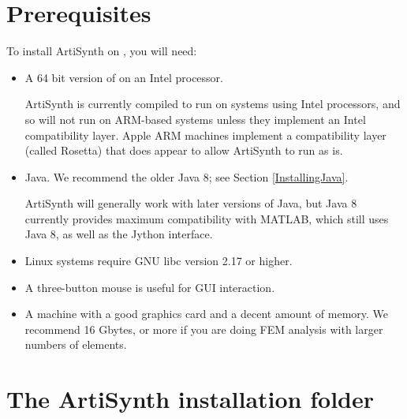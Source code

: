 \section{Prerequisites}
\label{Prerequisites}

To install ArtiSynth on \SYSTEM{}, you will need:

\begin{itemize}

\item A 64 bit version of \SYSTEM{} on an Intel processor.

\begin{sideblock}
ArtiSynth is currently compiled to run on systems using Intel
processors, and so will not run on ARM-based systems unless they
implement an Intel compatibility layer. Apple ARM machines implement a
compatibility layer (called Rosetta) that does appear to allow
ArtiSynth to run as is.
\end{sideblock}

\item Java. We recommend the older Java 8; see Section \ref{InstallingJava}.

\begin{sideblock}
ArtiSynth will generally work with later versions of Java, but Java 8
currently provides maximum compatibility with MATLAB, which still uses
Java 8, as well as the Jython interface.
\end{sideblock}

\ifLinux
\item Linux systems require GNU libc version 2.17 or higher.
\fi

\item A three-button mouse is useful for GUI interaction.

\item A machine with a good graphics card and a decent amount of
memory. We recommend 16 Gbytes, or more if you are doing FEM analysis
with larger numbers of elements.

\end{itemize}

\section{The ArtiSynth installation folder}
\label{FileConventions}

